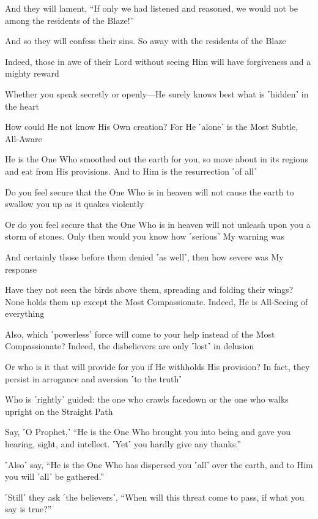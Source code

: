 And they will lament, “If only we had listened and reasoned, we would not be among the residents of the Blaze!”

And so they will confess their sins. So away with the residents of the Blaze

Indeed, those in awe of their Lord without seeing Him will have forgiveness and a mighty reward

Whether you speak secretly or openly—He surely knows best what is ˹hidden˺ in the heart

How could He not know His Own creation? For He ˹alone˺ is the Most Subtle, All-Aware

He is the One Who smoothed out the earth for you, so move about in its regions and eat from His provisions. And to Him is the resurrection ˹of all˺

Do you feel secure that the One Who is in heaven will not cause the earth to swallow you up as it quakes violently

Or do you feel secure that the One Who is in heaven will not unleash upon you a storm of stones. Only then would you know how ˹serious˺ My warning was

And certainly those before them denied ˹as well˺, then how severe was My response

Have they not seen the birds above them, spreading and folding their wings? None holds them up except the Most Compassionate. Indeed, He is All-Seeing of everything

Also, which ˹powerless˺ force will come to your help instead of the Most Compassionate? Indeed, the disbelievers are only ˹lost˺ in delusion

Or who is it that will provide for you if He withholds His provision? In fact, they persist in arrogance and aversion ˹to the truth˺

Who is ˹rightly˺ guided: the one who crawls facedown or the one who walks upright on the Straight Path

Say, ˹O Prophet,˺ “He is the One Who brought you into being and gave you hearing, sight, and intellect. ˹Yet˺ you hardly give any thanks.”

˹Also˺ say, “He is the One Who has dispersed you ˹all˺ over the earth, and to Him you will ˹all˺ be gathered.”

˹Still˺ they ask ˹the believers˺, “When will this threat come to pass, if what you say is true?”

